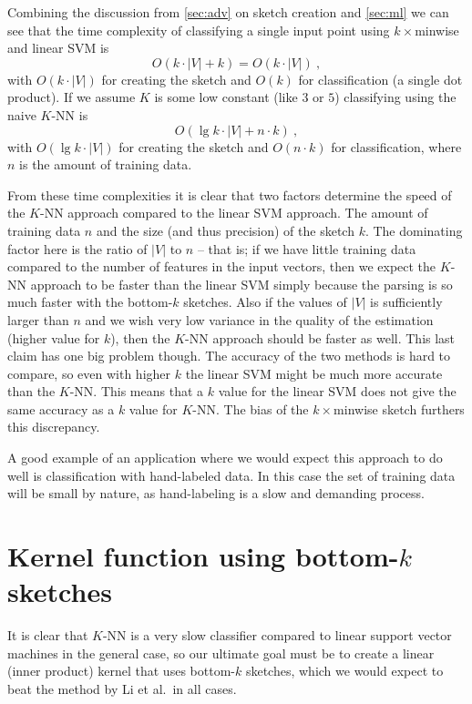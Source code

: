 Combining the discussion from \autoref{sec:adv} on sketch creation and
\autoref{sec:ml} we can see that the time complexity of classifying a single
input point using $k\times$minwise and linear SVM is
\begin{equation}
    O(k\cdot |V| + k) = O(k\cdot |V|)\ ,
\end{equation}
with $O(k\cdot |V|)$ for creating the sketch and $O(k)$ for
classification (a single dot product). If we assume $K$ is some low constant
(like $3$ or $5$) classifying using the naive $K$-NN is
\begin{equation}
    O(\lg k\cdot |V| + n\cdot k)\ ,
\end{equation}
with $O(\lg k\cdot |V|)$ for creating the sketch and $O(n\cdot k)$
for classification, where $n$ is the amount of training data.

From these time complexities it is clear that two factors determine the
speed of the $K$-NN approach compared to the linear SVM approach. The amount of
training data $n$ and the size (and thus precision) of the sketch $k$.
The dominating factor here is the ratio of $|V|$ to $n$ -- that is; if we
have little training data compared to the number of features in the input
vectors, then we expect the $K$-NN approach to be faster than the linear SVM
simply because the parsing is so much faster with the bottom-$k$ sketches.
Also if the values of $|V|$ is sufficiently larger than $n$ and we wish very
low variance in the quality of the estimation (higher value for $k$), then
the $K$-NN approach should be faster as well. This last claim has one big
problem though. The accuracy of the two methods is hard to compare, so even with
higher $k$ the linear SVM might be much more accurate than the $K$-NN. This means
that a $k$ value for the linear SVM does not give the same accuracy as a $k$
value for $K$-NN. The bias of the $k\times$minwise sketch furthers this
discrepancy.

A good example of an application where we would expect this approach to do
well is classification with hand-labeled data. In this case the set of
training data will be small by nature, as hand-labeling is a slow and
demanding process.


\section{Kernel function using bottom-$k$ sketches}\label{sec:botk_kernel}

It is clear that $K$-NN is a very slow classifier compared to linear support
vector machines in the general case, so our ultimate goal must be to create a
linear (inner product) kernel that uses bottom-$k$ sketches, which we would
expect to beat the method by Li et al.~in all cases.

